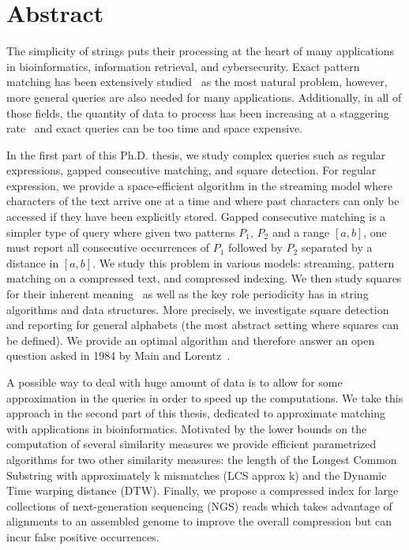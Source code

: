 \chapter*{Abstract}

The simplicity of strings puts their processing at the heart of many applications in bioinformatics, information retrieval, and cybersecurity. Exact pattern matching has been extensively studied~\cite{charras2004handbook} as the most natural problem, however, more general queries are also needed for many applications. Additionally, in all of those fields, the quantity of data to process has been increasing at a staggering rate~\cite{muir2016real} and exact queries can be too time and space expensive.

In the first part of this Ph.D. thesis, we study complex queries such as regular expressions, gapped consecutive matching, and square detection. 
For regular expression, we provide a space-efficient algorithm in the streaming model where characters of the text arrive one at a time and where past characters can only be accessed if they have been explicitly stored. 
Gapped consecutive matching is a simpler type of query where given two patterns $P_1$, $P_2$ and a range $[a,b]$, one must report all consecutive occurrences of $P_1$ followed by $P_2$ separated by a distance in $[a,b]$. We study this problem in various models: streaming, pattern matching on a compressed text, and compressed indexing.
We then study squares for their inherent meaning~\cite{Kolpakov2003} as well as the key role periodicity has in string algorithms and data structures. More precisely, we investigate square detection and reporting for general alphabets (the most abstract setting where squares can be defined). We provide an optimal algorithm and therefore answer an open question asked in 1984 by Main and Lorentz~\cite{Main1984}.

A possible way to deal with huge amount of data is to allow for some approximation in the queries in order to speed up the computations.
We take this approach in the second part of this thesis, dedicated to approximate matching with applications in bioinformatics.
Motivated by the lower bounds on the computation of several similarity measures we provide efficient parametrized algorithms for two other similarity measures: the length of the Longest Common Substring with approximately k mismatches (LCS approx k) and the Dynamic Time warping distance (DTW).
Finally, we propose a compressed index for large collections of next-generation sequencing (NGS) reads which takes advantage of alignments to an assembled genome to improve the overall compression but can incur false positive occurrences.


